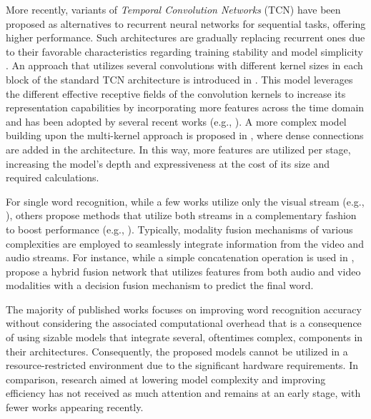 More recently, variants of \textit{Temporal Convolution Networks} (TCN) \cite{lea2017temporal} have been proposed as alternatives to recurrent neural networks for sequential tasks, offering higher performance.
Such architectures are gradually replacing recurrent ones due to their favorable characteristics regarding training stability and model simplicity \cite{bai2018empirical}.
An approach that utilizes several convolutions with different kernel sizes in each block of the standard TCN architecture is introduced in \cite{martinez2020lipreading}.
This model leverages the different effective receptive fields of the convolution kernels to increase its representation capabilities by incorporating more features across the time domain and has been adopted by several recent works (e.g., \cite{sheng2022importance, tian2022lipreading, peng2022lip}).
A more complex model building upon the multi-kernel approach is proposed in \cite{ma2021lip}, where dense connections are added in the architecture.
In this way, more features are utilized per stage, increasing the model's depth and expressiveness at the cost of its size and required calculations.

For single word recognition, while a few works utilize only the visual stream (e.g., \cite{chung2018learning, martinez2020lipreading}), others propose methods that utilize both streams in a complementary fashion to boost performance (e.g., \cite{xu2020watch, liu2021robust}). 
Typically, modality fusion mechanisms of various complexities are employed to seamlessly integrate information from the video and audio streams.
For instance, while a simple concatenation operation is used in \cite{xu2020watch}, \cite{liu2021robust} propose a hybrid fusion network that utilizes features from both audio and video modalities with a decision fusion mechanism to predict the final word.

The majority of published works focuses on improving word recognition accuracy without considering the associated computational overhead that is a consequence of using sizable models that integrate several, oftentimes complex, components in their architectures.
Consequently, the proposed models cannot be utilized in a resource-restricted environment due to the significant hardware requirements.
In comparison, research aimed at lowering model complexity and improving efficiency has not received as much attention and remains at an early stage, with fewer works appearing recently.

